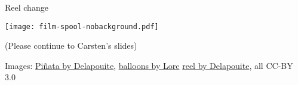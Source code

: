 \documentclass[aspectratio=169]{beamer}
\begin{document}
\begin{frame}{Reel change}
	\begin{block}{\texttt{[image: film-spool-nobackground.pdf]}\mbox{\quad}}
		\mbox{}

		\vspace{-1.7cm}

		(Please continue to Carsten's slides)
	\end{block}

	\vfill
	\tiny Images:
	\href{https://game-icons.net/1x1/delapouite/pinata.html}{Piñata by Delapouite},
	\href{https://game-icons.net/1x1/lorc/balloons.html}{balloons by Lorc}
	\href{https://game-icons.net/1x1/delapouite/film-spool.html}{reel by Delapouite}, all CC-BY 3.0
\end{frame}
\end{document}
